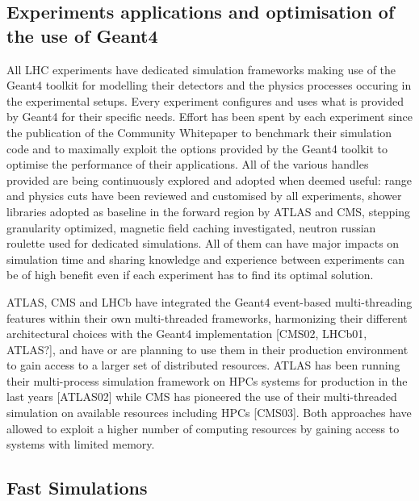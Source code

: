 \documentclass[10pt,a4paper]{article}
\begin{document}
\hypertarget{experiments-applications-and-optimisation-of-the-use-of-geant4}{%
\subsection{Experiments applications and optimisation of the use of
Geant4}\label{experiments-applications-and-optimisation-of-the-use-of-geant4}}

All LHC experiments have dedicated simulation frameworks making use of
the Geant4 toolkit for modelling their detectors and the physics
processes occuring in the experimental setups. Every experiment
configures and uses what is provided by Geant4 for their specific needs.
Effort has been spent by each experiment since the publication of the
Community Whitepaper to benchmark their simulation code and to maximally
exploit the options provided by the Geant4 toolkit to optimise the
performance of their applications. All of the various handles provided
are being continuously explored and adopted when deemed useful: range
and physics cuts have been reviewed and customised by all experiments,
shower libraries adopted as baseline in the forward region by ATLAS and
CMS, stepping granularity optimized, magnetic field caching
investigated, neutron russian roulette used for dedicated simulations.
All of them can have major impacts on simulation time and sharing
knowledge and experience between experiments can be of high benefit even
if each experiment has to find its optimal solution.

ATLAS, CMS and LHCb have integrated the Geant4 event-based
multi-threading features within their own multi-threaded frameworks,
harmonizing their different architectural choices with the Geant4
implementation {[}CMS02, LHCb01, ATLAS?{]}, and have or are planning to
use them in their production environment to gain access to a larger set
of distributed resources. ATLAS has been running their multi-process
simulation framework on HPCs systems for production in the last years
{[}ATLAS02{]} while CMS has pioneered the use of their multi-threaded
simulation on available resources including HPCs {[}CMS03{]}. Both
approaches have allowed to exploit a higher number of computing
resources by gaining access to systems with limited memory.

\hypertarget{fast-simulations}{%
\subsection{Fast Simulations}\label{fast-simulations}}
\end{document}

